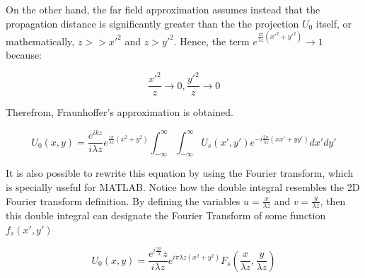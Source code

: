 On the other hand, the far field approximation assumes instead that the propagation distance is significantly greater than the the projection $U_0$ itself, or mathematically, $z >> x'^2$ and $z > y'^2$. Hence, the term $e^{\frac{i\pi}{\lambda z}(x'^2+y'^2)} \rightarrow 1$ because:

\begin{equation}
    \frac{x'^2}{z} \rightarrow 0, \frac{y'^2}{z} \rightarrow 0
\end{equation}

Therefrom, Fraunhoffer's approximation is obtained.

\begin{equation}
    U_0(x,y) = \frac{e^{ikz}}{i\lambda z}e^{\frac{i\pi}{\lambda z}(x^2+y^2)}\int_{-\infty}^{\infty}\int_{-\infty}^{\infty}U_s(x',y')e^{-i\frac{2\pi}{\lambda z} (xx'+yy')}dx'dy'
    \label{Far Field Approximation}
\end{equation}


It is also possible to rewrite this equation by using the Fourier transform, which is specially useful for MATLAB. Notice how the double integral resembles the 2D Fourier transform definition. By defining the variables $u = \frac{x}{\lambda z}$ and $v = \frac{y}{\lambda z}$, then this double integral can designate the Fourier Transform of some function $f_s(x',y')$

\begin{equation}
    U_0(x,y) = \frac{e^{i\frac{2\pi}{\lambda}}z}{i\lambda z}e^{i\pi \lambda z(x^2+y^2)}F_s(\frac{x}{\lambda z},\frac{y}{\lambda z})
\end{equation}
